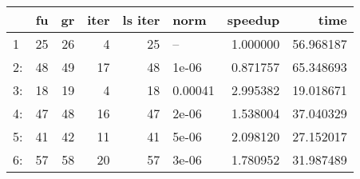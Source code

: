 \begin{tabular}{lrrrrlrr}
\toprule
{} &  fu &  gr &  iter &  ls iter &     norm &   speedup &       time \\
\midrule
1  &  25 &  26 &     4 &       25 &       -- &  1.000000 &  56.968187 \\
2: &  48 &  49 &    17 &       48 &    1e-06 &  0.871757 &  65.348693 \\
3: &  18 &  19 &     4 &       18 &  0.00041 &  2.995382 &  19.018671 \\
4: &  47 &  48 &    16 &       47 &    2e-06 &  1.538004 &  37.040329 \\
5: &  41 &  42 &    11 &       41 &    5e-06 &  2.098120 &  27.152017 \\
6: &  57 &  58 &    20 &       57 &    3e-06 &  1.780952 &  31.987489 \\
\bottomrule
\end{tabular}
